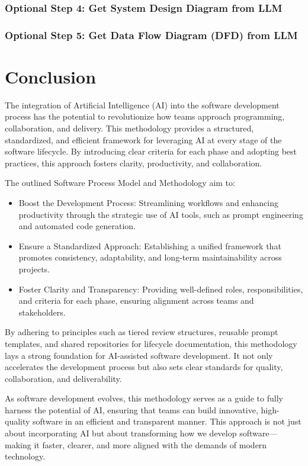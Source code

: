 \documentclass[14pt, a4paper]{article}
\begin{document}
\subsubsection*{Optional Step 4: Get System Design Diagram from LLM}

\subsubsection*{Optional Step 5: Get Data Flow Diagram (DFD) from LLM}


\section{Conclusion}

The integration of Artificial Intelligence (AI) into the software development
process has the potential to revolutionize how teams approach programming,
collaboration, and delivery. This methodology provides a structured,
standardized, and efficient framework for leveraging AI at every stage of the
software lifecycle. By introducing clear criteria for each phase and adopting
best practices, this approach fosters clarity, productivity, and collaboration.

The outlined Software Process Model and Methodology aim to:

\begin{itemize}
    \item Boost the Development Process: Streamlining workflows and enhancing
    productivity through the strategic use of AI tools, such as prompt
    engineering and automated code generation.
    \item Ensure a Standardized Approach: Establishing a unified framework that
    promotes consistency, adaptability, and long-term maintainability across
    projects.
    \item Foster Clarity and Transparency: Providing well-defined roles,
    responsibilities, and criteria for each phase, ensuring alignment across
    teams and stakeholders.
\end{itemize}

By adhering to principles such as tiered review structures, reusable prompt
templates, and shared repositories for lifecycle documentation, this methodology
lays a strong foundation for AI-assisted software development. It not only
accelerates the development process but also sets clear standards for quality,
collaboration, and deliverability.

As software development evolves, this methodology serves as a guide to fully
harness the potential of AI, ensuring that teams can build innovative,
high-quality software in an efficient and transparent manner. This approach is
not just about incorporating AI but about transforming how we develop
software—making it faster, clearer, and more aligned with the demands of modern
technology.
\end{document}
